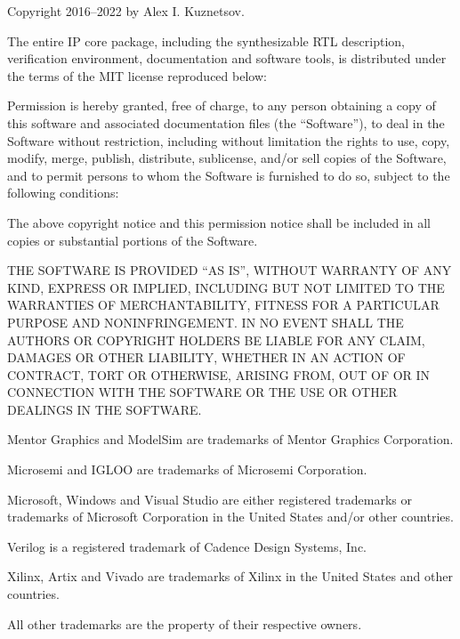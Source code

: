 {
\small
\setlength{\parindent}{0pt}
\nonzeroparskip

\vspace*{\fill}

Copyright \textcopyright{} 2016--2022 by Alex I. Kuznetsov.

The entire \lxp{} IP core package, including the synthesizable RTL description, verification environment, documentation and software tools, is distributed under the terms of the MIT license reproduced below:

Permission is hereby granted, free of charge, to any person obtaining a copy of this software and associated documentation files (the ``Software''), to deal in the Software without restriction, including without limitation the rights to use, copy, modify, merge, publish, distribute, sublicense, and/or sell copies of the Software, and to permit persons to whom the Software is furnished to do so, subject to the following conditions:

The above copyright notice and this permission notice shall be included in all copies or substantial portions of the Software.

THE SOFTWARE IS PROVIDED ``AS IS'', WITHOUT WARRANTY OF ANY KIND, EXPRESS OR IMPLIED, INCLUDING BUT NOT LIMITED TO THE WARRANTIES OF MERCHANTABILITY, FITNESS FOR A PARTICULAR PURPOSE AND NONINFRINGEMENT. IN NO EVENT SHALL THE AUTHORS OR COPYRIGHT HOLDERS BE LIABLE FOR ANY CLAIM, DAMAGES OR OTHER LIABILITY, WHETHER IN AN ACTION OF CONTRACT, TORT OR OTHERWISE, ARISING FROM, OUT OF OR IN CONNECTION WITH THE SOFTWARE OR THE USE OR OTHER DEALINGS IN THE SOFTWARE.

\vspace{4\baselineskip}

Mentor Graphics and ModelSim are trademarks of Mentor Graphics Corporation.

Microsemi and IGLOO are trademarks of Microsemi Corporation.

Microsoft, Windows and Visual Studio are either registered trademarks or trademarks of Microsoft Corporation in the United States and/or other countries.

Verilog is a registered trademark of Cadence Design Systems, Inc.

Xilinx, Artix and Vivado are trademarks of Xilinx in the United States and other countries.

All other trademarks are the property of their respective owners.
}

\cleardoublepage



\tableofcontents*
